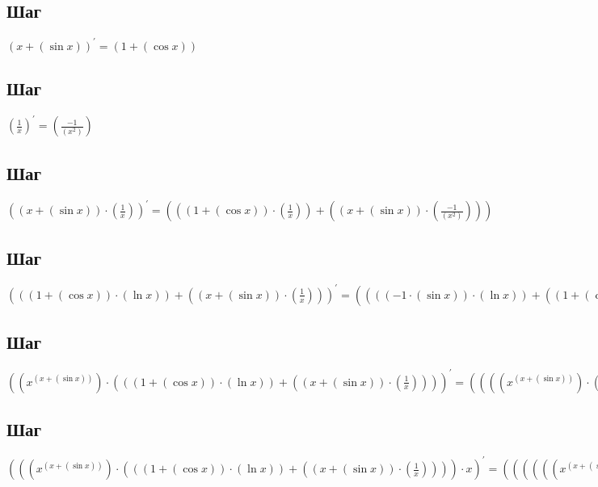 \documentclass[12pt, letterpaper]{article}
\begin{document}
\subsection{Шаг}
\hfil $({x}+{(\sin{x})})^{\prime} = ({1}+{(\cos{x})})$

\subsection{Шаг}
\hfil $(\frac{1}{x})^{\prime} = (\frac{-1}{({x}^{2})})$

\subsection{Шаг}
\hfil $({({x}+{(\sin{x})})}\cdot{(\frac{1}{x})})^{\prime} = ({({({1}+{(\cos{x})})}\cdot{(\frac{1}{x})})}+{({({x}+{(\sin{x})})}\cdot{(\frac{-1}{({x}^{2})})})})$

\subsection{Шаг}
\hfil $({({({1}+{(\cos{x})})}\cdot{(\ln{x})})}+{({({x}+{(\sin{x})})}\cdot{(\frac{1}{x})})})^{\prime} = ({({({({-1}\cdot{(\sin{x})})}\cdot{(\ln{x})})}+{({({1}+{(\cos{x})})}\cdot{(\frac{1}{x})})})}+{({({({1}+{(\cos{x})})}\cdot{(\frac{1}{x})})}+{({({x}+{(\sin{x})})}\cdot{(\frac{-1}{({x}^{2})})})})})$

\subsection{Шаг}
\hfil $({({x}^{({x}+{(\sin{x})})})}\cdot{({({({1}+{(\cos{x})})}\cdot{(\ln{x})})}+{({({x}+{(\sin{x})})}\cdot{(\frac{1}{x})})})})^{\prime} = ({({({({x}^{({x}+{(\sin{x})})})}\cdot{({({({1}+{(\cos{x})})}\cdot{(\ln{x})})}+{({({x}+{(\sin{x})})}\cdot{(\frac{1}{x})})})})}\cdot{({({({1}+{(\cos{x})})}\cdot{(\ln{x})})}+{({({x}+{(\sin{x})})}\cdot{(\frac{1}{x})})})})}+{({({x}^{({x}+{(\sin{x})})})}\cdot{({({({({-1}\cdot{(\sin{x})})}\cdot{(\ln{x})})}+{({({1}+{(\cos{x})})}\cdot{(\frac{1}{x})})})}+{({({({1}+{(\cos{x})})}\cdot{(\frac{1}{x})})}+{({({x}+{(\sin{x})})}\cdot{(\frac{-1}{({x}^{2})})})})})})})$

\subsection{Шаг}
\hfil $({({({x}^{({x}+{(\sin{x})})})}\cdot{({({({1}+{(\cos{x})})}\cdot{(\ln{x})})}+{({({x}+{(\sin{x})})}\cdot{(\frac{1}{x})})})})}\cdot{x})^{\prime} = ({({({({({({x}^{({x}+{(\sin{x})})})}\cdot{({({({1}+{(\cos{x})})}\cdot{(\ln{x})})}+{({({x}+{(\sin{x})})}\cdot{(\frac{1}{x})})})})}\cdot{({({({1}+{(\cos{x})})}\cdot{(\ln{x})})}+{({({x}+{(\sin{x})})}\cdot{(\frac{1}{x})})})})}+{({({x}^{({x}+{(\sin{x})})})}\cdot{({({({({-1}\cdot{(\sin{x})})}\cdot{(\ln{x})})}+{({({1}+{(\cos{x})})}\cdot{(\frac{1}{x})})})}+{({({({1}+{(\cos{x})})}\cdot{(\frac{1}{x})})}+{({({x}+{(\sin{x})})}\cdot{(\frac{-1}{({x}^{2})})})})})})})}\cdot{x})}+{({({x}^{({x}+{(\sin{x})})})}\cdot{({({({1}+{(\cos{x})})}\cdot{(\ln{x})})}+{({({x}+{(\sin{x})})}\cdot{(\frac{1}{x})})})})})$
\end{document}
